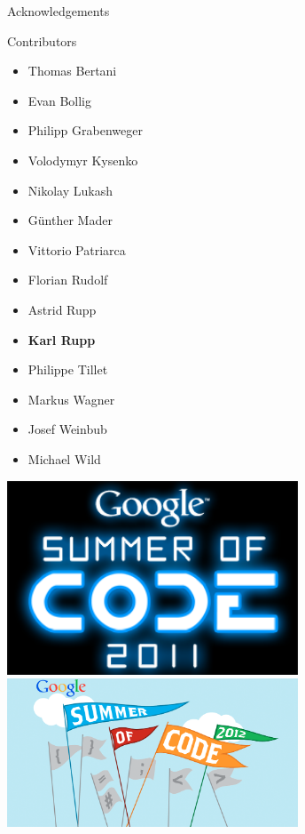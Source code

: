 



\begin{frame}{Acknowledgements}

 \begin{minipage}{0.5\textwidth}
  \begin{block}{Contributors}
    \begin{itemize}
     \item Thomas Bertani
     \item Evan Bollig
     \item Philipp Grabenweger
     \item Volodymyr Kysenko
     \item Nikolay Lukash
     \item G\"unther Mader
     \item Vittorio Patriarca
     \item Florian Rudolf
     \item Astrid Rupp
     \item \textbf{Karl Rupp}
     \item Philippe Tillet
     \item Markus Wagner
     \item Josef Weinbub
     \item Michael Wild
    \end{itemize}
  \end{block}
 \end{minipage}
 \begin{minipage}{0.4\textwidth}
  \includegraphics[width=0.65\textwidth]{figs/gsoc2011.png}
  \vspace*{0.2cm} \\
  \includegraphics[width=0.65\textwidth]{figs/gsoc2012.png}

\end{minipage}
\end{frame}
